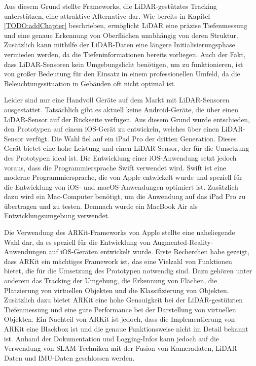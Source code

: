 Aus diesem Grund stellte Frameworks, die LiDAR-gestütztes Tracking unterstützen, eine attraktive Alternative dar. Wie bereits in Kapitel \ref{TODO:addChapter} beschrieben, ermöglicht LiDAR eine präzise Tiefenmessung und eine genaue Erkennung von Oberflächen unabhängig von deren Struktur. Zusätzlich kann mithilfe der LiDAR-Daten eine längere Initialisierungsphase vermieden werden, da die Tiefeninformationen bereits vorliegen. Auch der Fakt, dass LiDAR-Sensoren kein Umgebungslicht benötigen, um zu funktionieren, ist von großer Bedeutung für den Einsatz in einem professionellen Umfeld, da die Beleuchtungssituation in Gebäuden oft nicht optimal ist.

Leider sind nur eine Handvoll Geräte auf dem Markt mit LiDAR-Sensoren ausgestattet. Tatsächlich gibt es aktuell keine Android-Geräte, die über einen LiDAR-Sensor auf der Rückseite verfügen. Aus diesem Grund wurde entschieden, den Prototypen auf einem iOS-Gerät zu entwickeln, welches über einen LiDAR-Sensor verfügt. Die Wahl fiel auf ein iPad Pro der dritten Generation. Dieses Gerät bietet eine hohe Leistung und einen LiDAR-Sensor, der für die Umsetzung des Prototypen ideal ist. Die Entwicklung einer iOS-Anwendung setzt jedoch voraus, dass die Programmiersprache Swift verwendet wird. Swift ist eine moderne Programmiersprache, die von Apple entwickelt wurde und speziell für die Entwicklung von iOS- und macOS-Anwendungen optimiert ist. Zusätzlich dazu wird ein Mac-Computer benötigt, um die Anwendung auf das iPad Pro zu übertragen und zu testen. Demnach wurde ein MacBook Air als Entwicklungsumgebung verwendet.

Die Verwendung des ARKit-Frameworks von Apple stellte eine naheliegende Wahl dar, da es speziell für die Entwicklung von Augmented-Reality-Anwendungen auf iOS-Geräten entwickelt wurde. Erste Recherchen habe gezeigt, dass ARKit ein mächtiges Framework ist, das eine Vielzahl von Funktionen bietet, die für die Umsetzung des Prototypen notwendig sind. Dazu gehören unter anderem das Tracking der Umgebung, die Erkennung von Flächen, die Platzierung von virtuellen Objekten und die Klassifizierung von Objekten. Zusätzlich dazu bietet ARKit eine hohe Genauigkeit bei der LiDAR-gestützten Tiefenmessung und eine gute Performance bei der Darstellung von virtuellen Objekten. Ein Nachteil von ARKit ist jedoch, dass die Implementierung von ARKit eine Blackbox ist und die genaue Funktionsweise nicht im Detail bekannt ist. Anhand der Dokumentation und Logging-Infos kann jedoch auf die Verwendung von SLAM-Techniken mit der Fusion von Kameradaten, LiDAR-Daten und IMU-Daten geschlossen werden.

